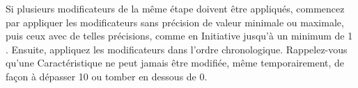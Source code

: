 Si plusieurs modificateurs de la même étape doivent être appliqués, commencez par appliquer les modificateurs sans précision de valeur minimale ou maximale, puis ceux avec de telles précisions, comme  en Initiative jusqu'à un minimum de 1 \fg{}. Ensuite, appliquez les modificateurs dans l'ordre chronologique. Rappelez-vous qu'une Caractéristique ne peut jamais être modifiée, même temporairement, de façon à dépasser 10 ou tomber en dessous de 0.

